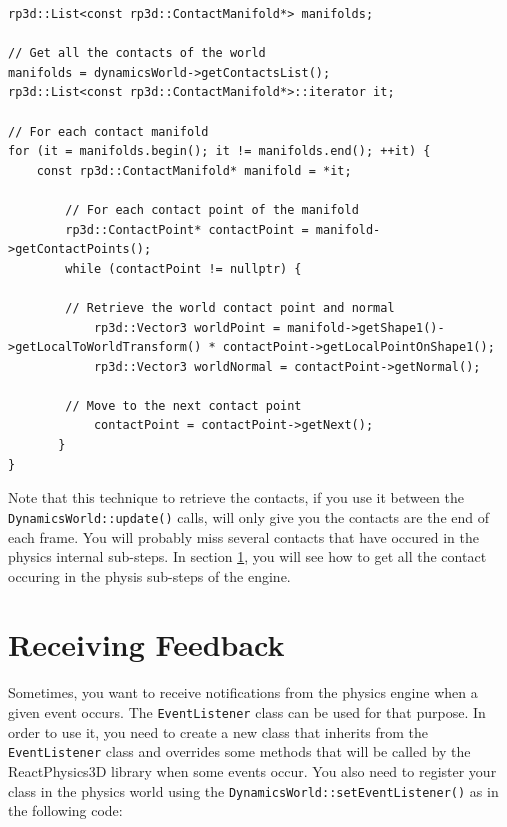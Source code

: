 \documentclass[a4paper,12pt]{article}
\begin{document}
    \begin{lstlisting}
rp3d::List<const rp3d::ContactManifold*> manifolds;

// Get all the contacts of the world
manifolds = dynamicsWorld->getContactsList();
rp3d::List<const rp3d::ContactManifold*>::iterator it;

// For each contact manifold 
for (it = manifolds.begin(); it != manifolds.end(); ++it) {
    const rp3d::ContactManifold* manifold = *it;

        // For each contact point of the manifold
        rp3d::ContactPoint* contactPoint = manifold->getContactPoints();
        while (contactPoint != nullptr) {

	    // Retrieve the world contact point and normal
            rp3d::Vector3 worldPoint = manifold->getShape1()->getLocalToWorldTransform() * contactPoint->getLocalPointOnShape1();
            rp3d::Vector3 worldNormal = contactPoint->getNormal();

	    // Move to the next contact point
            contactPoint = contactPoint->getNext();
       }
}
    \end{lstlisting}

     \vspace{0.6cm}

    Note that this technique to retrieve the contacts, if you use it between the \texttt{Dynamics\allowbreak World::update()} calls, will only give you the contacts are the end of
    each frame. You will probably miss several contacts that have occured in the physics internal sub-steps. In section \ref{sec:receiving_feedback}, you will
    see how to get all the contact occuring in the physis sub-steps of the engine. 

    \section{Receiving Feedback}

    \label{sec:receiving_feedback}
    Sometimes, you want to receive notifications from the physics engine when a given event occurs. The \texttt{EventListener} class can be used for that purpose. In order to use
    it, you need to create a new class that inherits from the \texttt{EventListener} class and overrides some methods that will be called by the ReactPhysics3D library when some events
    occur. You also need to register your class in the physics world using the \texttt{DynamicsWorld::setEventListener()} as in the following code: \\
\end{document}
